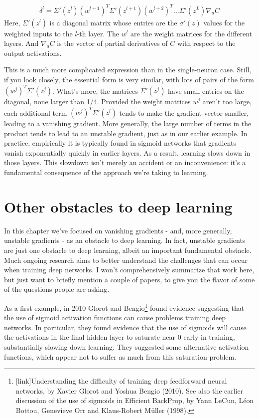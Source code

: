 \documentclass[a4paper,twoside,10pt]{book}
\begin{document}
\begin{eqnarray}
\delta^l = \Sigma'(z^l) (w^{l+1})^T \Sigma'(z^{l+1}) (w^{l+2})^T \ldots\Sigma'(z^L) \nabla_a C
\label{eq:124}
\end{eqnarray}
Here, $\Sigma'(z^l)$ is a diagonal matrix whose entries are the $\sigma'(z)$ values for the weighted inputs to the $l$-th layer. The $w^l$ are the weight matrices for the different layers. And $\nabla_aC$ is the vector of partial derivatives of $C$ with respect to the output activations.

This is a much more complicated expression than in the single-neuron case. Still, if you look closely, the essential form is very similar, with lots of pairs of the form $(w^j)^T\Sigma'(z^j)$. What's more, the matrices $\Sigma'(z^j)$ have small entries on the diagonal, none larger than 1/4. Provided the weight matrices $w^j$ aren't too large, each additional term $(w^j)^T\Sigma'(z^l)$ tends to make the gradient vector smaller, leading to a vanishing gradient. More generally, the large number of terms in the product tends to lead to an unstable gradient, just as in our earlier example. In practice, empirically it is typically found in sigmoid networks that gradients vanish exponentially quickly in earlier layers. As a result, learning slows down in those layers. This slowdown isn't merely an accident or an inconvenience: it's a fundamental consequence of the approach we're taking to learning.

\section{Other obstacles to deep learning}
In this chapter we've focused on vanishing gradients - and, more generally, unstable gradients - as an obstacle to deep learning. In fact, unstable gradients are just one obstacle to deep learning, albeit an important fundamental obstacle. Much ongoing research aims to better understand the challenges that can occur when training deep networks. I won't comprehensively summarize that work here, but just want to briefly mention a couple of papers, to give you the flavor of some of the questions people are asking.

As a first example, in 2010 Glorot and Bengio\footnote{[link]Understanding the difficulty of training deep feedforward neural networks, by Xavier Glorot and Yoshua Bengio (2010). See also the earlier discussion of the use of sigmoids in Efficient BackProp, by Yann LeCun, L\'eon Bottou, Genevieve Orr and Klaus-Robert M\"uller (1998).} found evidence suggesting that the use of sigmoid activation functions can cause problems training deep networks. In particular, they found evidence that the use of sigmoids will cause the activations in the final hidden layer to saturate near 0 early in training, substantially slowing down learning. They suggested some alternative activation functions, which appear not to suffer as much from this saturation problem.
\end{document}
